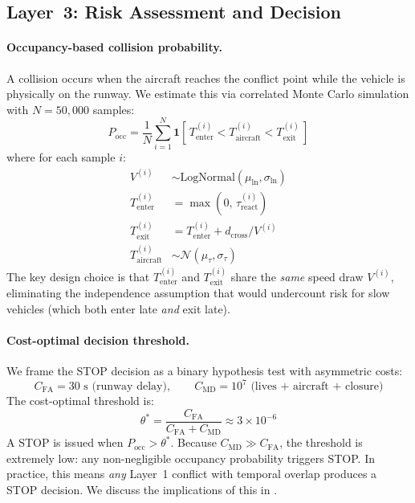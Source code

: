 \documentclass[11pt,a4paper]{article}
\begin{document}
\subsection{Layer~3: Risk Assessment and Decision}
\label{sec:layer3}

\paragraph{Occupancy-based collision probability.}
A collision occurs when the aircraft reaches the conflict point while the vehicle is physically on the runway.
We estimate this via correlated Monte Carlo simulation with $N = 50{,}000$ samples:
\begin{equation}
    P_{\mathrm{occ}} = \frac{1}{N} \sum_{i=1}^{N} \mathbf{1}\!\left[\, T_{\mathrm{enter}}^{(i)} < T_{\mathrm{aircraft}}^{(i)} < T_{\mathrm{exit}}^{(i)} \,\right]
    \label{eq:occupancy}
\end{equation}
where for each sample $i$:
\begin{align}
    V^{(i)} &\sim \mathrm{LogNormal}(\mu_{\ln}, \sigma_{\ln}) \label{eq:mc_speed}\\
    T_{\mathrm{enter}}^{(i)} &= \max(0, \, \tau_{\mathrm{react}}^{(i)}) \label{eq:mc_enter}\\
    T_{\mathrm{exit}}^{(i)} &= T_{\mathrm{enter}}^{(i)} + d_{\mathrm{cross}} / V^{(i)} \label{eq:mc_exit}\\
    T_{\mathrm{aircraft}}^{(i)} &\sim \mathcal{N}(\mu_{\tau}, \sigma_{\tau}) \label{eq:mc_aircraft}
\end{align}
The key design choice is that $T_{\mathrm{enter}}^{(i)}$ and $T_{\mathrm{exit}}^{(i)}$ share the \emph{same} speed draw $V^{(i)}$, eliminating the independence assumption that would undercount risk for slow vehicles (which both enter late \emph{and} exit late).

\paragraph{Cost-optimal decision threshold.}
We frame the STOP decision as a binary hypothesis test with asymmetric costs:
\begin{equation}
    C_{\mathrm{FA}} = 30 \text{~s (runway delay)}, \qquad C_{\mathrm{MD}} = 10^7 \text{~(lives + aircraft + closure)}
\end{equation}
The cost-optimal threshold is:
\begin{equation}
    \theta^{*} = \frac{C_{\mathrm{FA}}}{C_{\mathrm{FA}} + C_{\mathrm{MD}}} \approx 3 \times 10^{-6}
    \label{eq:threshold}
\end{equation}
A STOP is issued when $P_{\mathrm{occ}} > \theta^{*}$.
Because $C_{\mathrm{MD}} \gg C_{\mathrm{FA}}$, the threshold is extremely low: any non-negligible occupancy probability triggers STOP.
In practice, this means \emph{any} Layer~1 conflict with temporal overlap produces a STOP decision.
We discuss the implications of this in .
\end{document}
